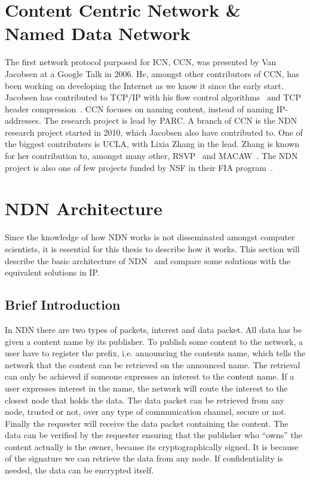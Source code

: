 \section{Content Centric Network \& Named Data Network}\label{chp2:sec:icn}
The first network protocol purposed for \gls{ICN}, \gls{CCN}, was presented by Van Jacobsen at a Google Talk in 2006. 
He, amongst other contributors of \gls{CCN}, has been working on developing the Internet as we know it since the early start.
Jacobsen has contributed to \gls{TCP}/\gls{IP} with his flow control algorithms~\cite{DBLP:conf/sigcomm/Jacobson88} and \gls{TCP} header compression~\cite{rfc1144}.
\gls{CCN} focuses on naming content, instead of naming \gls{IP}-addresses. 
The research project is lead by \gls{PARC}.
A branch of \gls{CCN} is the \gls{NDN}~\cite{DBLP:journals/ccr/0001ABJcCPWZ14} research project started in 2010, which Jacobsen also have contributed to.
One of the biggest contributers is \gls{UCLA}, with Lixia Zhang in the lead. 
Zhang is known for her contribution to, amongst many other, \gls{RSVP}~\cite{rfc2205} and \gls{MACAW}~\cite{DBLP:conf/sigcomm/BharghavanDSZ94}.
The \gls{NDN} project is also one of few projects funded by \gls{NSF} in their \gls{FIA} program~\cite{nsf-fia}.

\section{NDN Architecture}\label{chp2:sec:ndn_architecture}
Since the knowledge of how \gls{NDN} works is not disseminated amongst computer scientists, it is essential for this thesis to describe how it works.
This section will describe the basic architecture of \gls{NDN}~\cite{NDN-0021} and compare some solutions with the equivalent solutions in \gls{IP}.

\subsection{Brief Introduction}
In \gls{NDN} there are two types of packets, \gls{interest} and \gls{data} packet.
All \gls{data} has be given a content \gls{name} by its \gls{publisher}. 
To publish some content to the network, a user have to register the prefix, i.e. announcing the contents \gls{name}, which tells the network that the content can be retrieved on the announced \gls{name}. 
The retrieval can only be achieved if someone expresses an \gls{interest} to the content \gls{name}.
If a user expresses \gls{interest} in the \gls{name}, the network will route the \gls{interest} to the closest \gls{node} that holds the \gls{data}. 
The \gls{data} packet can be retrieved from any \gls{node}, trusted or not, over any type of communication channel, secure or not. 
Finally the requester will receive the \gls{data} packet containing the content.
The \gls{data} can be verified by the requester ensuring that the \gls{publisher} who ``owns'' the content actually is the owner, because its cryptographically signed.
It is because of the signature we can retrieve the \gls{data} from any \gls{node}.
If confidentiality is needed, the \gls{data} can be encrypted itself. 

